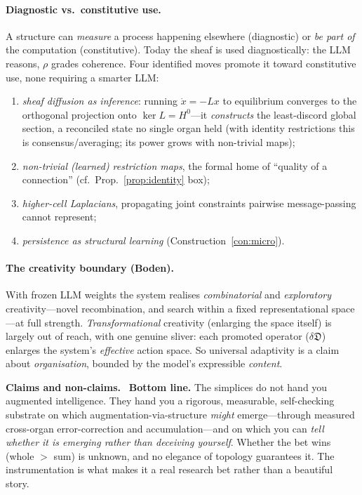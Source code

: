 \documentclass[11pt]{article}
\theoremstyle{definition}
\theoremstyle{plain}
\theoremstyle{remark}
\newcommand{\Hon}{\noindent\textbf{\color{honestycol}Claims and non-claims.}\ }
\newcommand{\Dop}{\mathfrak{D}}     %
\newcommand{\Hzero}{H^{0}}
\begin{document}
\paragraph{Diagnostic vs.\ constitutive use.}
A structure can \emph{measure} a process happening elsewhere (diagnostic) or \emph{be
part of} the computation (constitutive). Today the sheaf is used diagnostically: the
LLM reasons, $\rho$ grades coherence. Four identified moves promote it toward
constitutive use, none requiring a smarter LLM:
\begin{enumerate}[label=(\arabic*),nosep]
  \item \emph{sheaf diffusion as inference}: running $\dot x=-Lx$ to equilibrium
        converges to the orthogonal projection onto $\ker L=\Hzero$---it
        \emph{constructs} the least-discord global section, a reconciled state no
        single organ held (with identity restrictions this is consensus/averaging; its
        power grows with non-trivial maps);
  \item \emph{non-trivial (learned) restriction maps}, the formal home of ``quality of
        a connection'' (cf.\ Prop.~\ref{prop:identity} box);
  \item \emph{higher-cell Laplacians}, propagating joint constraints pairwise
        message-passing cannot represent;
  \item \emph{persistence as structural learning} (Construction~\ref{con:micro}).
\end{enumerate}

\paragraph{The creativity boundary (Boden).}
With frozen LLM weights the system realises \emph{combinatorial} and \emph{exploratory}
creativity---novel recombination, and search within a fixed representational
space---at full strength. \emph{Transformational} creativity (enlarging the space
itself) is largely out of reach, with one genuine sliver: each promoted operator
($\delta\Dop$) enlarges the system's \emph{effective} action space. So universal
adaptivity is a claim about \emph{organisation}, bounded by the model's expressible
\emph{content}.

\begin{hon}\Hon
\textbf{Bottom line.} The simplices do not hand you augmented intelligence. They hand
you a rigorous, measurable, self-checking substrate on which
augmentation-via-structure \emph{might} emerge---through measured cross-organ
error-correction and accumulation---and on which you can \emph{tell whether it is
emerging rather than deceiving yourself}. Whether the bet wins (whole $>$ sum) is
unknown, and no elegance of topology guarantees it. The instrumentation is what makes
it a real research bet rather than a beautiful story.
\end{hon}
\end{document}
